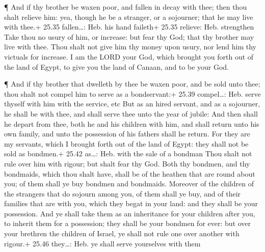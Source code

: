  ¶ And if thy brother be waxen poor, and fallen in decay
with thee; then thou shalt relieve him: yea, though he be a stranger, or
a sojourner; that he may live with thee.+ 25.35 fallen\ldots: Heb. his
hand faileth+ 25.35 relieve: Heb. strengthen  Take thou no
usury of him, or increase: but fear thy God; that thy brother may live
with thee.  Thou shalt not give him thy money upon usury,
nor lend him thy victuals for increase.  I am the LORD your
God, which brought you forth out of the land of Egypt, to give you the
land of Canaan, and to be your God.

 ¶ And if thy brother that dwelleth by thee be waxen poor,
and be sold unto thee; thou shalt not compel him to serve as a
bondservant:+ 25.39 compel\ldots: Heb. serve thyself with him with the
service, etc  But as an hired servant, and as a sojourner,
he shall be with thee, and shall serve thee unto the year of jubile:
 And then shall he depart from thee, both he and his
children with him, and shall return unto his own family, and unto the
possession of his fathers shall he return.  For they are my
servants, which I brought forth out of the land of Egypt: they shall not
be sold as bondmen.+ 25.42 as\ldots: Heb. with the sale of a bondman
 Thou shalt not rule over him with rigour; but shalt fear
thy God.  Both thy bondmen, and thy bondmaids, which thou
shalt have, shall be of the heathen that are round about you; of them
shall ye buy bondmen and bondmaids.  Moreover of the
children of the strangers that do sojourn among you, of them shall ye
buy, and of their families that are with you, which they begat in your
land: and they shall be your possession.  And ye shall take
them as an inheritance for your children after you, to inherit them for
a possession; they shall be your bondmen for ever: but over your
brethren the children of Israel, ye shall not rule one over another with
rigour.+ 25.46 they\ldots: Heb. ye shall serve yourselves with them

